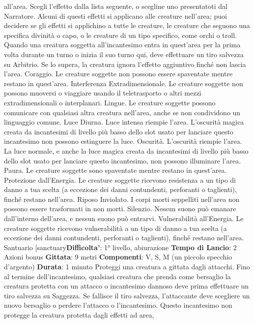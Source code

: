 \begin{multicols}{2}
all’area. Scegli l’effetto dalla lista seguente, o scegline
uno presentatoti dal Narratore. Alcuni di questi effetti si
applicano alle creature nell’area; puoi decidere se gli
effetti si applichino a tutte le creature, le creature che
seguono una specifica divinità o capo, o le creature di
un tipo specifico, come orchi o troll. Quando una
creatura soggetta all’incantesimo entra in quest’area
per la prima volta durante un turno o inizia il suo turno
qui, deve effettuare un tiro salvezza su Arbitrio. Se lo
supera, la creatura ignora l’effetto aggiuntivo finché non
lascia l’area.
Coraggio. Le creature soggette non possono essere
spaventate mentre restano in quest’area.
Interferenza Extradimensionale. Le creature soggette
non possono muoversi o viaggiare usando il
teletrasporto o altri mezzi extradimensionali o
interplanari.
Lingue. Le creature soggette possono comunicare con
qualsiasi altra creatura nell’area, anche se non
condividono un linguaggio comune.
Luce Diurna. Luce intensa riempie l’area. L’oscurità
magica creata da incantesimi di livello più basso dello
slot usato per lanciare questo incantesimo non possono
estinguere la luce.
Oscurità. L’oscurità riempie l’area. La luce normale, e
anche la luce magica creata da incantesimi di livello più
basso dello slot usato per lanciare questo incantesimo,
non possono illuminare l’area.
Paura. Le creature soggette sono spaventate mentre
restano in quest’area.
Protezione dall’Energia. Le creature soggette
ricevono resistenza a un tipo di danno a tua scelta (a
eccezione dei danni contundenti, perforanti o taglienti),
finché restano nell’area.
Riposo Inviolato. I corpi morti seppelliti nell’area non
possono essere trasformati in non morti.
Silenzio. Nessun suono può emanare dall’interno
dell’area, e nessun suono può entrarvi.
Vulnerabilità all’Energia. Le creature soggette
ricevono vulnerabilità a un tipo di danno a tua scelta (a
eccezione dei danni contundenti, perforanti o taglienti),
finché restano nell’area.
Santuario
[sanctuary\textbf{Difficolta'}:
1° livello, abiurazione
\textbf{Tempo di Lancio}: 2 Azioni bonus
\textbf{Gittata}: 9 metri
\textbf{Componenti}: V, S, M (un piccolo specchio d’argento)
\textbf{Durata}: 1 minuto
Proteggi una creatura a gittata dagli attacchi. Fino al
termine dell’incantesimo, qualsiasi creatura che prenda
come bersaglio la creatura protetta con un attacco o
incantesimo dannoso deve prima effettuare un tiro
salvezza su Saggezza. Se fallisce il tiro salvezza,
l’attaccante deve scegliere un nuovo bersaglio o
perdere l’attacco o l’incantesimo. Questo incantesimo
non protegge la creatura protetta dagli effetti ad area,

\end{multicols}

